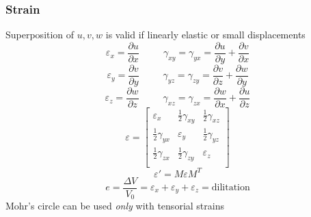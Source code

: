 \documentclass[twocolumn, 12pt]{article}    %
\begin{document}
\subsubsection*{Strain}
Superposition of \(u,v,w\) is valid if linearly elastic or small displacements 
\begin{equation*}
    \varepsilon_x =  \frac{\partial{u}}{\partial{x}} \hspace{30pt} 
    \gamma_{xy}=\gamma_{yx} =  \frac{\partial{u}}{\partial{y}} +  \frac{\partial{v}}{\partial{x}} 
\end{equation*}
\begin{equation*}
    \varepsilon_y = \frac{\partial{v}}{\partial{y}} \hspace{30pt} \gamma_{yz}=\gamma_{zy} = \frac{\partial{v}}{\partial{z}} +  \frac{\partial{w}}{\partial{y}}
\end{equation*}
\begin{equation*}
    \varepsilon_z =  \frac{\partial{w}}{\partial{z}} \hspace{30pt}  \gamma_{xz}=\gamma_{zx} =  \frac{\partial{w}}{\partial{x}} + \frac{\partial{u}}{\partial{z}}
\end{equation*}
\begin{equation*}
    \varepsilon = \begin{bmatrix}
        \varepsilon_x & \frac{1}{2}\gamma_{xy} & \frac{1}{2}\gamma_{xz}\\
        \frac{1}{2}\gamma_{yx} & \varepsilon_y & \frac{1}{2}\gamma_{yz}\\
        \frac{1}{2}\gamma_{zx} & \frac{1}{2}\gamma_{zy} & \varepsilon_z\\
    \end{bmatrix}
\end{equation*}
\begin{equation*}
    \varepsilon' = M\varepsilon M^T
\end{equation*}
\begin{equation*}
    e = \frac{\Delta V}{V_0} = \varepsilon_x + \varepsilon_y+
    \varepsilon_z = \text{dilitation}
\end{equation*}
Mohr's circle can be used \emph{only} with tensorial strains
\end{document}

